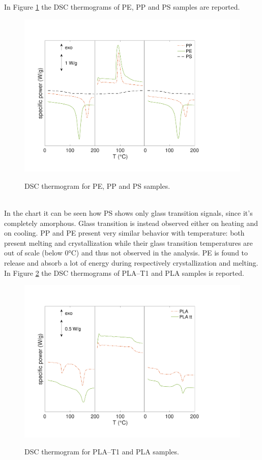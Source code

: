 \documentclass[a4paper, 11pt]{article}
\begin{document}
In Figure \ref{fig:dscPP} the DSC thermograms of PE, PP and PS samples are reported. 
\begin{figure}[htp]
\centering
{\includegraphics[scale=0.4]{dscPP}} 
\captionsetup{justification=centering}
\caption{DSC thermogram for PE, PP and PS samples.}
\label{fig:dscPP}
\end{figure}\\
In the chart it can be seen how PS shows only glass transition signals, since it's completely amorphous. Glass transition is instead observed either on heating and on cooling. PP and PE present very similar behavior with temperature: both present melting and crystallization while their glass transition temperatures are out of scale (below 0°C) and thus not observed in the analysis. PE is found to release and absorb a lot of energy during respectively crystallization and melting.  \\
In Figure \ref{fig:dscPLA} the DSC thermograms of PLA–T1 and PLA samples is reported. 
\begin{figure}[htp]
\centering
{\includegraphics[scale=0.4]{dscPLA}} 
\captionsetup{justification=centering}
\caption{DSC thermogram for PLA–T1 and PLA samples.}
\label{fig:dscPLA}
\end{figure}\\
\end{document}
